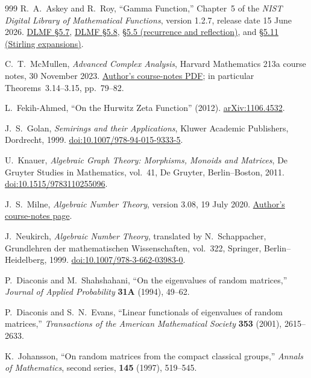\begin{thebibliography}{999}
R.~A.~Askey and R.~Roy,
\textquotedblleft{}Gamma Function,''
Chapter~5 of the \emph{NIST Digital Library of Mathematical Functions},
version 1.2.7, release date 15 June 2026.
\href{https://dlmf.nist.gov/5.7}{DLMF \S5.7},
\href{https://dlmf.nist.gov/5.8}{DLMF \S5.8},
\href{https://dlmf.nist.gov/5.5}{\S5.5 (recurrence and reflection)}, and
\href{https://dlmf.nist.gov/5.11}{\S5.11 (Stirling expansions)}.

C.~T.~McMullen,
\emph{Advanced Complex Analysis},
Harvard Mathematics 213a course notes, 30 November 2023.
\href{https://people.math.harvard.edu/~ctm/home/text/class/harvard/213a/23/html/home/course/course.pdf}
{Author's course-notes PDF}; in particular Theorems~3.14--3.15,
pp.~79--82.

L.~Fekih-Ahmed,
\textquotedblleft{}On the Hurwitz Zeta Function'' (2012).
\href{https://arxiv.org/abs/1106.4532}{arXiv:1106.4532}.

J.~S.~Golan,
\emph{Semirings and their Applications},
Kluwer Academic Publishers, Dordrecht, 1999.
\href{https://doi.org/10.1007/978-94-015-9333-5}{doi:10.1007/978-94-015-9333-5}.

U.~Knauer,
\emph{Algebraic Graph Theory: Morphisms, Monoids and Matrices},
De Gruyter Studies in Mathematics, vol.~41, De Gruyter, Berlin--Boston, 2011.
\href{https://doi.org/10.1515/9783110255096}{doi:10.1515/9783110255096}.

J.~S.~Milne,
\emph{Algebraic Number Theory}, version 3.08, 19 July 2020.
\href{https://www.jmilne.org/math/CourseNotes/ant.html}{Author's course-notes page}.

J.~Neukirch,
\emph{Algebraic Number Theory}, translated by N.~Schappacher,
Grundlehren der mathematischen Wissenschaften, vol.~322,
Springer, Berlin--Heidelberg, 1999.
\href{https://doi.org/10.1007/978-3-662-03983-0}{doi:10.1007/978-3-662-03983-0}.

P.~Diaconis and M.~Shahshahani,
``On the eigenvalues of random matrices,''
\emph{Journal of Applied Probability} \textbf{31A} (1994), 49--62.

P.~Diaconis and S.~N.~Evans,
``Linear functionals of eigenvalues of random matrices,''
\emph{Transactions of the American Mathematical Society} \textbf{353} (2001),
2615--2633.

K.~Johansson,
``On random matrices from the compact classical groups,''
\emph{Annals of Mathematics}, second series, \textbf{145} (1997), 519--545.


\end{thebibliography}
